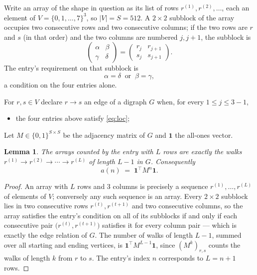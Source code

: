 \documentclass[11pt,a4paper]{article}
\theoremstyle{plain}
\newtheorem{lemma}[theorem]{Lemma}
\theoremstyle{definition}
\begin{document}
Write an array of the shape in question as its list of rows
$r^{(1)},r^{(2)},\dots$, each an element of
$V=\{0,1,\dots,7\}^{3}$, so $|V|=S=512$. A $2\times2$ subblock of the array
occupies two consecutive rows and two consecutive columns; if the two rows are $r$
and $s$ (in that order) and the two columns are numbered $j,j+1$,
the subblock is
\[
\begin{pmatrix}\alpha&\beta\\\gamma&\delta\end{pmatrix}=\begin{pmatrix}r_j&r_{j+1}\\s_j&s_{j+1}\end{pmatrix}.
\]
The entry's requirement on that subblock is
\begin{equation}\label{eq:loc}
\alpha=\delta\ \text{ or }\ \beta=\gamma,
\end{equation}
a condition on the four entries alone.

For $r,s\in V$ declare $r\to s$ an edge of a digraph $G$ when, for every
$1\le j\le 3-1$,
\begin{itemize}
\item the four entries above satisfy \eqref{eq:loc};

\end{itemize}
Let $M\in\{0,1\}^{S\times S}$ be the adjacency matrix of $G$ and $\mathbf{1}$ the
all-ones vector.

\begin{lemma}\label{lem:walk}
The arrays counted by the entry with $L$ rows are exactly the walks
$r^{(1)}\to r^{(2)}\to\cdots\to r^{(L)}$ of length $L-1$ in $G$. Consequently
\[
a(n)\;=\;\mathbf{1}^{\!\top}M^{n}\mathbf{1} .
\]
\end{lemma}

\begin{proof}
An array with $L$ rows and $3$ columns is precisely a sequence
$r^{(1)},\dots,r^{(L)}$ of elements of $V$; conversely any such sequence is an array.
Every $2\times2$ subblock lies in two consecutive rows $r^{(t)},r^{(t+1)}$ and two
consecutive columns, so the array satisfies the entry's condition on all of its subblocks
if and only if each consecutive pair $\bigl(r^{(t)},r^{(t+1)}\bigr)$ satisfies it for
every column pair --- which is exactly the edge relation of $G$. The number of walks of
length $L-1$, summed over all starting and ending vertices, is
$\mathbf{1}^{\!\top}M^{L-1}\mathbf{1}$, since $(M^{k})_{r,s}$ counts the walks of
length $k$ from $r$ to $s$. The entry's index $n$ corresponds to $L=n+1$ rows.
\end{proof}
\end{document}
